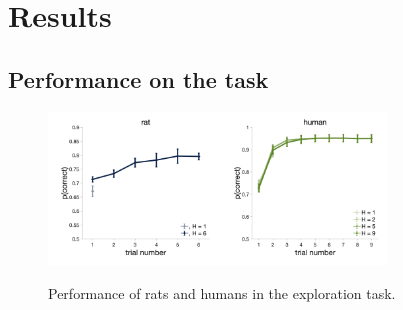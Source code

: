 \documentclass[12pt]{article}
\begin{document}
%	


\section*{Results}
\subsection*{Performance on the task}
\begin{figure}[H]
	\begin{center}
			\includegraphics[width=0.4\textwidth]{figs/RatEE_performance.png}\includegraphics[width=0.4\textwidth]{figs/OneshotHuman_performance.png}
			\caption{Performance of rats and humans in the exploration task.}
	\end{center}
\end{figure}
\end{document}
